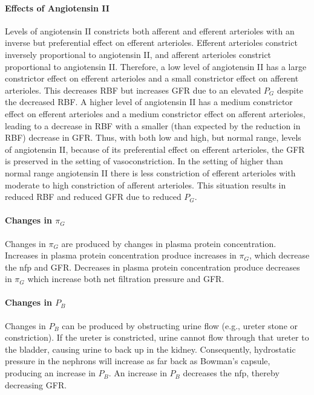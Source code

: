 \paragraph{Effects of Angiotensin II}

Levels of angiotensin II constricts both afferent and efferent arterioles with an inverse but preferential effect on efferent arterioles. Efferent arterioles constrict inversely proportional to angiotensin II, and afferent arterioles constrict proportional to angiotensin II. Therefore, a low level of angiotensin II has a large constrictor effect on efferent arterioles and a small constrictor effect on afferent arterioles. This decreases RBF but increases GFR due to an elevated $P_G$ despite the decreased RBF. A higher level of angiotensin II has a medium constrictor effect on efferent arterioles and a medium constrictor effect on afferent arterioles, leading to a decrease in RBF with a smaller (than expected by the reduction in RBF) decrease in GFR. Thus, with both low and high, but normal range, levels of angiotensin II, because of its preferential effect on efferent arterioles, the GFR is preserved in the setting of vasoconstriction. In the setting of higher than normal range angiotensin II there is less constriction of efferent arterioles with moderate to high constriction of afferent arterioles. This situation results in reduced RBF and reduced GFR due to reduced  $P_{G}$.

\paragraph{Changes in $\pi_{G}$}
Changes in $\pi_{G}$ are produced by changes in plasma protein concentration. Increases in plasma protein concentration produce increases in $\pi_{G}$, which decrease the nfp and GFR. Decreases in plasma protein concentration produce decreases in $\pi_{G}$ which increase both net filtration pressure and GFR.

\paragraph{Changes in $P_{B}$}
Changes in $P_{B}$ can be produced by obstructing urine flow (e.g., ureter stone or constriction). If the ureter is constricted, urine cannot flow through that ureter to the bladder, causing urine to back up in the kidney. Consequently, hydrostatic pressure in the nephrons will increase as far back as Bowman’s capsule, producing an increase in $P_{B}$. An increase in $P_{B}$ decreases the nfp, thereby decreasing GFR. 


